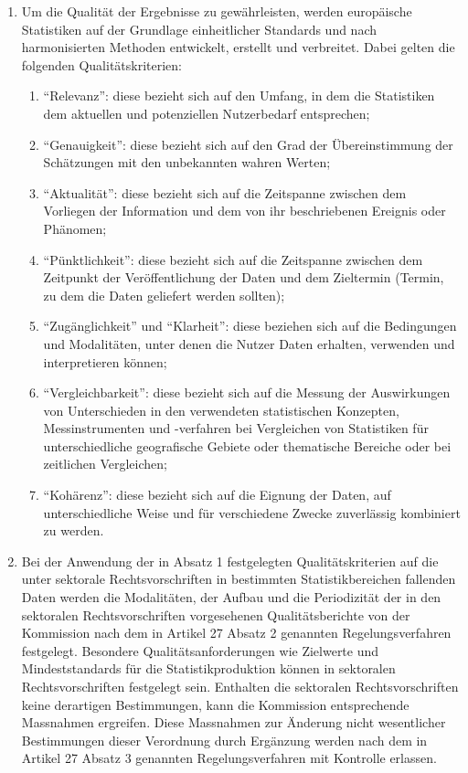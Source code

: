 \documentclass[A4, 12pt]{scrbook}
\begin{document}
        \begin{enumerate}[label=(\arabic*)]
            \item Um die Qualität der Ergebnisse zu gewährleisten, werden europäische Statistiken auf der Grundlage einheitlicher Standards und nach harmonisierten Methoden entwickelt, erstellt und verbreitet. Dabei gelten die folgenden Qualitätskriterien:
            \begin{enumerate}
                \item ``Relevanz'': diese bezieht sich auf den Umfang, in dem die Statistiken dem aktuellen und potenziellen Nutzerbedarf entsprechen;
                \item ``Genauigkeit'': diese bezieht sich auf den Grad der Übereinstimmung der Schätzungen mit den unbekannten wahren Werten;
                \item ``Aktualität'': diese bezieht sich auf die Zeitspanne zwischen dem Vorliegen der Information und dem von ihr beschriebenen Ereignis oder Phänomen;
                \item ``Pünktlichkeit'': diese bezieht sich auf die Zeitspanne zwischen dem Zeitpunkt der Veröffentlichung der Daten und dem Zieltermin (Termin, zu dem die Daten geliefert werden sollten);
                \item ``Zugänglichkeit'' und ``Klarheit'': diese beziehen sich auf die Bedingungen und Modalitäten, unter denen die Nutzer Daten erhalten, verwenden und interpretieren können;
                \item ``Vergleichbarkeit'': diese bezieht sich auf die Messung der Auswirkungen von Unterschieden in den verwendeten statistischen Konzepten, Messinstrumenten und -verfahren bei Vergleichen von Statistiken für unterschiedliche geografische Gebiete oder thematische Bereiche oder bei zeitlichen Vergleichen;
                \item ``Kohärenz'': diese bezieht sich auf die Eignung der Daten, auf unterschiedliche Weise und für verschiedene Zwecke zuverlässig kombiniert zu werden.
            \end{enumerate}
            \item Bei der Anwendung der in Absatz 1 festgelegten Qualitätskriterien auf die unter sektorale Rechtsvorschriften in bestimmten Statistikbereichen fallenden Daten werden die Modalitäten, der Aufbau und die Periodizität der in den sektoralen Rechtsvorschriften vorgesehenen Qualitätsberichte von der Kommission nach dem in Artikel 27 Absatz 2 genannten Regelungsverfahren festgelegt.
            Besondere Qualitätsanforderungen wie Zielwerte und Mindeststandards für die Statistikproduktion können in sektoralen Rechtsvorschriften festgelegt sein. Enthalten die sektoralen Rechtsvorschriften keine derartigen Bestimmungen, kann die Kommission entsprechende Massnahmen ergreifen. Diese Massnahmen zur Änderung nicht wesentlicher Bestimmungen dieser Verordnung durch Ergänzung werden nach dem in Artikel 27 Absatz 3 genannten Regelungsverfahren mit Kontrolle erlassen.

\end{enumerate}
\end{document}
